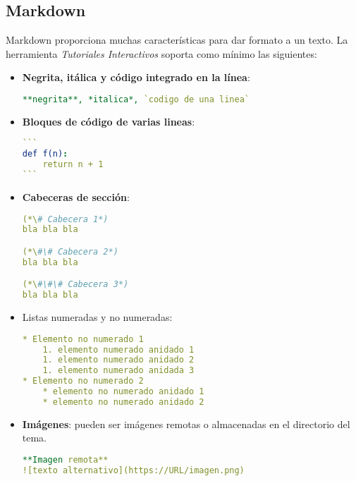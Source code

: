 \documentclass[]{article}
\newcommand{\toolname}{\emph{Tutoriales Interactivos}}
\begin{document}
\subsection{Markdown}
Markdown proporciona muchas características para dar formato a un texto. La herramienta \toolname{} soporta como mínimo las siguientes:
\begin{itemize}
	\item \textbf{Negrita, itálica y código integrado en la línea}:
\begin{lstlisting}[language=yaml,numbers=none]
**negrita**, *italica*, `codigo de una linea`
\end{lstlisting}	
	\item \textbf{Bloques de código de varias lineas}:
\begin{lstlisting}[language=yaml,numbers=none]
```
def f(n):
    return n + 1
```
\end{lstlisting}
	\item \textbf{Cabeceras de sección}:
\begin{lstlisting}[language=yaml,numbers=none]
(*\# Cabecera 1*)
bla bla bla

(*\#\# Cabecera 2*)
bla bla bla

(*\#\#\# Cabecera 3*)
bla bla bla

\end{lstlisting}
	\item Listas numeradas y no numeradas:
\begin{lstlisting}[language=yaml,numbers=none]
* Elemento no numerado 1
    1. elemento numerado anidado 1
    1. elemento numerado anidado 2
    1. elemento numerado anidada 3
* Elemento no numerado 2
    * elemento no numerado anidado 1
    * elemento no numerado anidado 2 
\end{lstlisting}	
	\item \textbf{Imágenes}: pueden ser imágenes remotas o almacenadas en el directorio del tema.
\begin{lstlisting}[language=yaml,numbers=none]
**Imagen remota**
![texto alternativo](https://URL/imagen.png)


\end{lstlisting}
\end{itemize}
\end{document}

